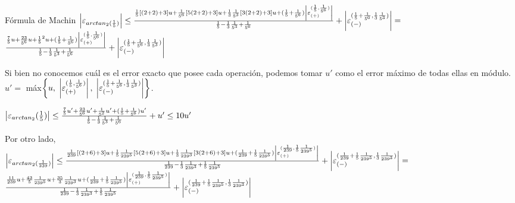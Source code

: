 \begin{subsection}{Fórmula de Machin}
	$\left|\varepsilon _{arctan_2(\frac{1}{5})}\right| \leq \frac{\frac{1}{5}[(2 + 2) + 3]u + \frac{1}{5^6}[5(2 + 2) + 3]u + \frac{1}{3}\frac{1}{5^3}[3(2 + 2) + 3]u + (\frac{1}{5}+\frac{1}{5^6})\left|\varepsilon _{({+})}^{({\frac{1}{5},\frac{1}{5^6}})}\right|}{\frac{1}{5}-\frac{1}{3}\frac{1}{5^3}+\frac{1}{5^6}} + \left|\varepsilon _{({-})}^{({\frac{1}{5}+\frac{1}{5^6},\frac{1}{3}\frac{1}{5^3}})}\right| =$\\
	
	$\frac{\frac{7}{5}u + \frac{23}{5^6}u +\frac{1}{5}^2u + (\frac{1}{5} + \frac{1}{5^6})\left|\varepsilon _{({+})}^{({\frac{1}{5},\frac{1}{5^6}})}\right|}{\frac{1}{5} - \frac{1}{3}\frac{1}{5^3} + \frac{1}{5^6}} + \left|\varepsilon _{({-})}^{({\frac{1}{5} + \frac{1}{5^6},\frac{1}{3}\frac{1}{5^3}})} \right|$\\
	
	\pa
	
	Si bien no conocemos cuál es el error exacto que posee cada operación, podemos tomar $u'$ como el error máximo de todas ellas en módulo.\\
	
	$u' =$ máx$\left\{u,\;\left|\varepsilon _{({+})}^{({\frac{1}{5},\frac{1}{5^6}})}\right|,\;\left|\varepsilon _{({-})}^{({\frac{1}{5} + \frac{1}{5^6},\frac{1}{3}\frac{1}{5^3}})}\right|\right\}$.\\
	
	\pa
	
	$\left| \varepsilon _{arctan_2}({\frac{1}{5}}) \right| \leq \frac{\frac{7}{5}u' + \frac{23}{5^6}u' +\frac{1}{5^2}u' + (\frac{1}{5} + \frac{1}{5^6})u'}{\frac{1}{5} - \frac{1}{3}\frac{1}{5^3} + \frac{1}{5^6}} + u' \leq 10u'$\\
	
	\pa
	
	Por otro lado,\\
	
	$\left|\varepsilon _{arctan_2(\frac{1}{239})}\right| \leq \frac{\frac{1}{239}[(2 + 6) + 3]u + \frac{1}{5}\frac{1}{239^5}[5(2 + 6) + 3]u + \frac{1}{3}\frac{1}{239^3}[3(2 + 6) + 3]u + (\frac{1}{239}+\frac{1}{5}\frac{1}{239^5})\left|\varepsilon _{({+})}^{({\frac{1}{239},\frac{1}{5}\frac{1}{239^5}})}\right|}{\frac{1}{239}-\frac{1}{3}\frac{1}{239^3}+\frac{1}{5}\frac{1}{239^5}} + \left|\varepsilon _{({-})}^{({\frac{1}{239}+\frac{1}{5}\frac{1}{239^5},\frac{1}{3}\frac{1}{239^3}})}\right| =$\\
	
	$\frac{\frac{11}{239}u + \frac{43}{5}\frac{1}{239^5}u + \frac{35}{3}\frac{1}{239^3}u + (\frac{1}{239}+\frac{1}{5}\frac{1}{239^5})\left|\varepsilon _{({+})}^{({\frac{1}{239},\frac{1}{5}\frac{1}{239^5}})}\right|}{\frac{1}{239}-\frac{1}{3}\frac{1}{239^3}+\frac{1}{5}\frac{1}{239^5}} + \left|\varepsilon _{({-})}^{({\frac{1}{239}+\frac{1}{5}\frac{1}{239^5},\frac{1}{3}\frac{1}{239^3}})}\right|$\\
	

\end{subsection}
